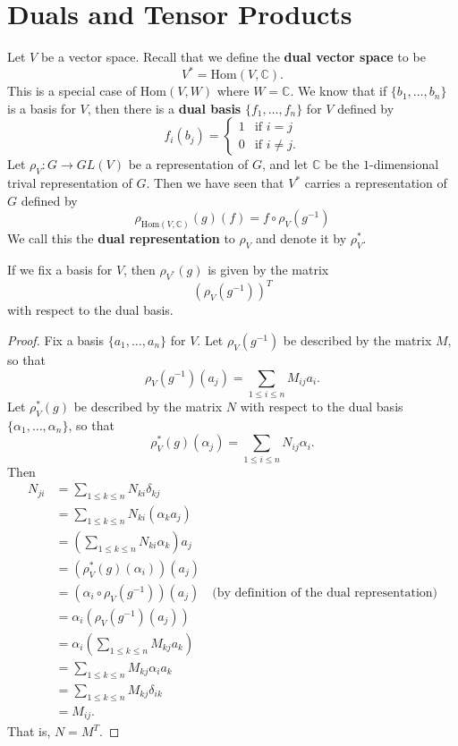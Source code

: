 \section{Duals and Tensor Products}
\begin{defn}
Let $V$ be a vector space.  Recall that we define the \textbf{dual vector space} to be
\[ V^{*} = \text{Hom}(V,\mathbb{C}).\]
This is a special case of $\text{Hom}(V,W)$ where $W = \mathbb{C}$. We know that if $\{ b_1, \ldots, b_n \} $ is a basis for $V$, then there is a \textbf{dual basis} $\{ f_1, \ldots, f_n \}$ for $V$ defined by
\[ f_i (b_j) = \begin{cases} 1 &\text{if } i=j \\ 0 &\text{if } i \neq j.  \end{cases} \]
Let $\rho_V \colon G \to GL(V)$ be a representation of $G$, and let $\mathbb{C}$ be the $1$-dimensional trival representation of $G$.  Then we have seen that $V^{*}$ carries a representation of $G$ defined by
\[ \rho_{\text{Hom}(V,\mathbb{C})} (g) (f) = f \circ \rho_V ( g^{-1}) \]
We call this the \textbf{dual representation} to $\rho_V$ and denote it by $\rho_V^{*}$.
\end{defn}
\begin{prop}\label{matrix-of-dual}
If we fix a basis for $V$, then $\rho_{V^*}(g)$ is given by the matrix 
\[( \rho_V (g^{-1}) )^T \]
with respect to the dual basis.
\end{prop}
\begin{proof}
Fix a basis $\{ a_1, \ldots, a_n \}$ for $V$.  Let $\rho_V (g^{-1})$ be described by the matrix $M$, so that 
\[ \rho_V (g^{-1} ) (a_j) = \sum_{1 \leq i \leq n} M_{ij} a_i. \]
Let $\rho_V^* (g)$ be described by the matrix $N$ with respect to the dual basis $\{ \alpha_1, \ldots, \alpha_n \}$, so that
\[ \rho_V^* (g) (\alpha_j)  = \sum_{1 \leq i \leq n} N_{ij} \alpha_i. \]
Then
\begin{align*}
N_{ji} &= \sum_{1 \leq k \leq n} N_{ki} \delta_{kj} \\
	&=\sum_{1 \leq k \leq n} N_{ki}( \alpha_k a_j )\\
	&= \left( \sum_{1 \leq k \leq n} N_{ki} \alpha_k \right) a_j \\
	&= (\rho_V^* (g) (\alpha_i )) (a_j) \\
	&= (\alpha_i \circ \rho_V (g^{-1}) ) (a_j) \quad \text{(by definition of the dual representation)} \\
	&= \alpha_i ( \rho_V(g^{-1}) (a_j)) \\
	&= \alpha_i \left(  \sum_{1 \leq k \leq n} M_{kj} a_k \right) \\
	&= \sum_{1 \leq k \leq n} M_{kj} \alpha_i a_k \\
	&= \sum_{1 \leq k \leq n} M_{kj} \delta_{ik} \\
	&= M_{ij}.
\end{align*}
That is,  $N=M^T$.
\end{proof}

